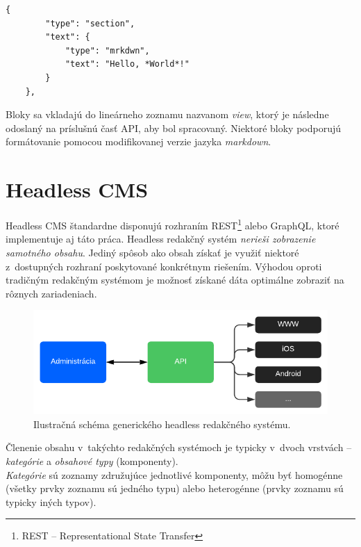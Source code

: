 \begin{lstlisting}[caption=Príklad jednoduchého bloku v~Slack aplikácií.]
	{
		"type": "section",
		"text": {
			"type": "mrkdwn",
			"text": "Hello, *World*!"
		}
	},
\end{lstlisting}

\medskip

\noindent Bloky sa vkladajú do lineárneho zoznamu nazvanom \emph{view}, ktorý je následne odoslaný na príslušnú časť API, aby bol spracovaný. Niektoré bloky podporujú formátovanie pomocou modifikovanej verzie jazyka \emph{markdown}.

\chapter{Headless CMS}
\label{theory:headless}
Headless CMS štandardne disponujú rozhraním REST\footnote{REST -- Representational State Transfer} alebo GraphQL, ktoré implementuje aj táto práca. Headless redakčný systém \emph{nerieši zobrazenie samotného obsahu}. Jediný spôsob ako obsah získať je využiť niektoré z~dostupných rozhraní poskytované konkrétnym riešením. Výhodou oproti tradičným redakčným systémom je možnosť získané dáta optimálne zobraziť na rôznych zariadeniach. 

\begin{figure}[h]
	\centering
	\includegraphics{obrazky-figures/headless_cms_graph.pdf}
	\caption{Ilustračná schéma generického headless redakčného systému.}
\end{figure}

\noindent Členenie obsahu v~takýchto redakčných systémoch je typicky v~dvoch vrstvách -- \emph{kategórie} a \emph{obsahové typy} (komponenty). \\

\noindent \emph{Kategórie} sú zoznamy združujúce jednotlivé komponenty, môžu byť homogénne (všetky prvky zoznamu sú jedného typu) alebo heterogénne (prvky zoznamu sú typicky iných typov). \\

